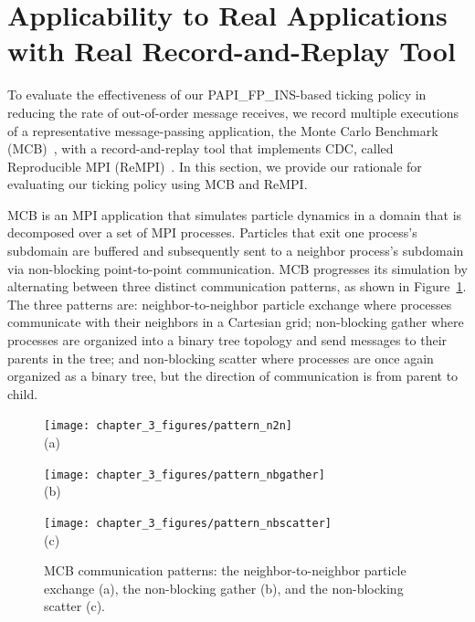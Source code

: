 \section{Applicability to Real Applications with Real Record-and-Replay Tool}

To evaluate the effectiveness of our PAPI\_FP\_INS-based ticking
policy in reducing the rate of out-of-order message receives, we
record multiple executions of a representative message-passing
application, the Monte Carlo Benchmark (MCB)~\cite{Software:MCB}, with a
record-and-replay tool that implements CDC, called Reproducible MPI
(ReMPI)~\cite{ClockDeltaCompression:Sato:2015}. 
In this section, we provide our rationale for
evaluating our ticking policy using MCB and ReMPI.

MCB is an MPI application that simulates particle dynamics in a domain
that is decomposed over a set of MPI processes. Particles that exit
one process's subdomain are buffered and subsequently sent to a
neighbor process's subdomain via non-blocking point-to-point
communication. MCB progresses its simulation by alternating between
three distinct communication patterns, as shown in
Figure~\ref{fig:mcb_comm_patterns}. The three patterns are:
neighbor-to-neighbor particle exchange where processes communicate
with their neighbors in a Cartesian grid; non-blocking gather where
processes are organized into a binary tree topology and send messages
to their parents in the tree; and non-blocking scatter where processes
are once again organized as a binary tree, but the direction of
communication is from parent to child.
\begin{figure}
    \centering
    \begin{minipage}{0.33\textwidth}
        \centering
        \texttt{[image: chapter\_3\_figures/pattern\_n2n]}
        \\ (a) \\
    \end{minipage}%
    \begin{minipage}{0.33\textwidth}
        \centering
        \texttt{[image: chapter\_3\_figures/pattern\_nbgather]}
        \\ (b) \\
    \end{minipage}%
    \begin{minipage}{0.33\textwidth}
        \centering
        \texttt{[image: chapter\_3\_figures/pattern\_nbscatter]}
         \\ (c) \\
    \end{minipage}%
    \caption{MCB communication patterns: the neighbor-to-neighbor
      particle exchange (a), the non-blocking gather (b), and the
      non-blocking scatter (c).}
    \label{fig:mcb_comm_patterns}
\end{figure}
